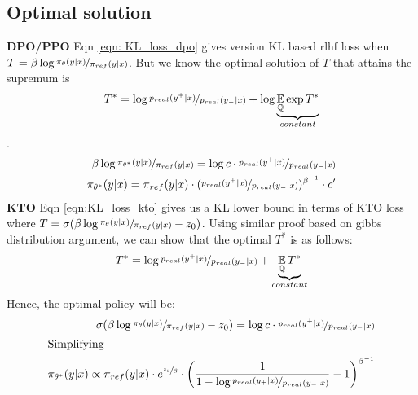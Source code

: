 \documentclass{article}
\begin{document}
\subsection{Optimal solution}
\textbf{DPO/PPO}
Eqn \ref{eqn: KL_loss_dpo} gives version KL based rlhf loss when $T=\beta\log\nicefrac{\pi_\theta(y|x)}{\pi_{ref}(y|x)}$. But we know the optimal solution of $T$ that attains the supremum is $$T^*=\log \nicefrac{p_{real}(y^+|x)}{p_{real}(y_-|x)}+\log \underbrace{\operatorname*{\mathbb{E}}_\mathbb{Q}\exp T^*}_{constant}$$\cite{Park2021DeepRepresentation}. 
\begin{align}
    \beta\log\nicefrac{\pi_{\theta^*}(y|x)}{\pi_{ref}(y|x)}= \log c\cdot\nicefrac{p_{real}(y^+|x)}{p_{real}(y_-|x)}\\
    \pi_{\theta^*}(y|x)=\pi_{ref}(y|x)\cdot(\nicefrac{p_{real}(y^+|x)}{p_{real}(y_-|x)})^{\beta^{-1}}\cdot c'
    \label{eqn:optimal_dpo}
\end{align}
\textbf{KTO} Eqn \ref{eqn:KL_loss_kto} gives us a KL lower bound in terms of KTO loss where $T=\sigma(\beta\log\sfrac{\pi_\theta(y|x)}{\pi_{ref}(y|x)}-z_0)$. Using similar proof based on gibbs distribution argument, we can show that the optimal $T^*$ is as follows:
$$T^*=\log \nicefrac{p_{real}(y^+|x)}{p_{real}(y_-|x)}+ \underbrace{\operatorname*{\mathbb{E}}_\mathbb{Q}T^*}_{constant}$$
Hence, the optimal policy will be:
\begin{align}
    \sigma(\beta\log\sfrac{\pi_\theta(y|x)}{\pi_{ref}(y|x)}-z_0)=\log c\cdot\nicefrac{p_{real}(y^+|x)}{p_{real}(y_-|x)}\\
    \intertext{Simplifying}
    \pi_{\theta^*}(y|x)\propto\pi_{ref}(y|x) \cdot e^{\sfrac{z_0}{\beta}}\cdot\left(\frac{1}{1-\log \nicefrac{p_{real}(y_+|x)}{p_{real}(y_-|x)}} -1\right)^{\beta^{-1}}
    \label{eqn:optimal_kto}
\end{align}
\end{document}
